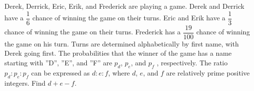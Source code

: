 Derek, Derrick, Eric, Erik, and Frederick are playing a game. Derek and Derrick have a $\dfrac{1}{6}$ chance of winning the game on their turns. Eric and Erik have a $\dfrac{1}{3}$ chance of winning the game on their turns. Frederick has a $\dfrac{19}{100}$ chance of winning the game on his turn. Turns are determined alphabetically by first name, with Derek going first. The probabilities that the winner of the game has a name starting with ''D'', ''E'', and ''F'' are $p_d$, $p_e$, and $p_f$ , respectively. The ratio $p_d : p_e : p_f$ can be expressed as $d : e : f$, where $d$, $e$, and $f$ are relatively prime positive integers. Find $d + e - f$.
